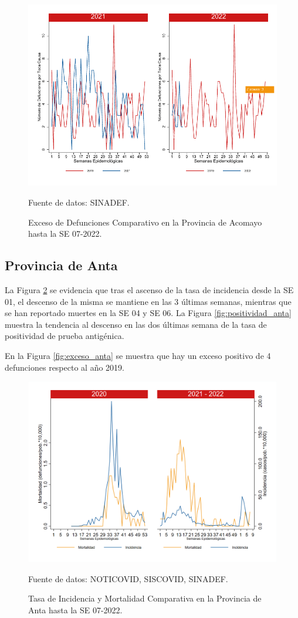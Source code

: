 \documentclass[12pt,a4paper,openany]{book}
\begin{document}
		\begin{figure}[h]
			\caption{Exceso de Defunciones Comparativo en la Provincia de Acomayo hasta la SE 07-2022.}\label{fig:exceso_acomayo}
			\begin{center}
				\includegraphics[width=0.7\linewidth]{../figuras/exceso_1.pdf}
			\end{center}
			{\footnotesize {Fuente de datos: SINADEF.}}
		\end{figure}
		
		\clearpage
		
		\subsection*{Provincia de Anta}
		\noindent La Figura \ref{fig:inc_mort_anta}  se evidencia que tras el ascenso de la tasa de incidencia desde la SE 01, el descenso de la misma se mantiene en las 3 últimas semanas, mientras que se han reportado muertes en la SE 04 y SE 06. 
		\noindent La Figura
		\ref{fig:positividad_anta} muestra la tendencia al descenso en las dos últimas semana de la tasa de positividad de prueba antigénica. 
		
		En la Figura \ref{fig:exceso_anta} se muestra que hay un exceso positivo de 4 defunciones respecto al año 2019.
		
		\begin{figure}[h]
			\caption{Tasa de Incidencia y Mortalidad Comparativa en la Provincia de Anta hasta la SE 07-2022.}\label{fig:inc_mort_anta}
			\begin{center}
				\includegraphics[width=0.7\linewidth]{../figuras/incidencia_mortalidad_20_21_2.png}
			\end{center}
			{\footnotesize {Fuente de datos: NOTICOVID, SISCOVID, SINADEF.}}
		\end{figure}
		
\end{document}
